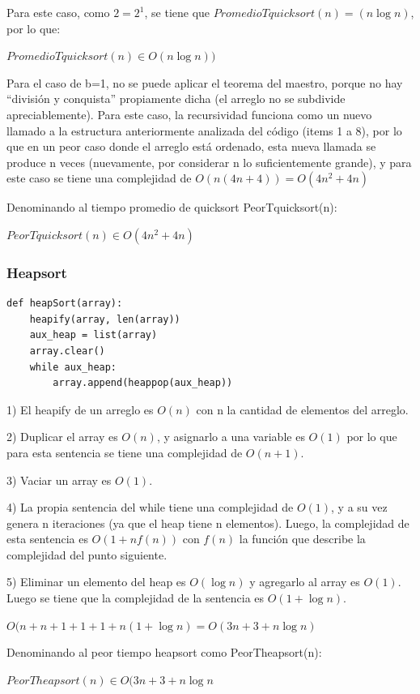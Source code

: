 \documentclass[article,a4paper]{article}
\begin{document}
Para este caso, como $2 = 2^1$, se tiene que $PromedioTquicksort(n) = (n \log n)$, por lo que:

$PromedioTquicksort(n) \in O(n \log n))$

Para el caso de b=1, no se puede aplicar el teorema del maestro, porque no hay “división y conquista” propiamente dicha (el arreglo no se subdivide apreciablemente). Para este caso, la recursividad funciona como un nuevo llamado a la estructura anteriormente analizada del código (items 1 a 8), por lo que en un peor caso donde el arreglo está ordenado, esta nueva llamada se produce n veces (nuevamente, por considerar n lo suficientemente grande), y para este caso se tiene una complejidad de $O( n(4n + 4) ) =  O( 4n^2 + 4n)$

Denominando al tiempo promedio de quicksort PeorTquicksort(n):

$PeorTquicksort(n) \in O(4n^2 + 4n)$

\subsubsection{Heapsort}
\begin{verbatim}
def heapSort(array):
    heapify(array, len(array))
    aux_heap = list(array)
    array.clear()
    while aux_heap:
        array.append(heappop(aux_heap))
\end{verbatim}
1)  El heapify de un arreglo es $O(n)$ con n la cantidad de elementos del arreglo.

2) Duplicar el array es $O(n)$, y asignarlo a una variable es $O(1)$ por lo que para esta sentencia se tiene una complejidad de $O(n + 1)$.

3) Vaciar un array es $O(1)$. 

4) La propia sentencia del while tiene una complejidad de $O(1)$, y a su vez genera n iteraciones (ya que el heap tiene n elementos). Luego, la complejidad de esta sentencia es $O( 1 + nf(n))$ con $f(n)$ la función que describe la complejidad del punto siguiente.

5) Eliminar un elemento del heap es $O(\log n)$ y agregarlo al array es $O(1)$. Luego se tiene que la complejidad de la sentencia es $O(1 + \log n)$. 

$O( n + n +1 + 1 +1+n(1 + \log n  ) = O( 3n + 3 +n \log n )$ 

Denominando al peor tiempo heapsort como PeorTheapsort(n):

$PeorTheapsort(n)  \in O(3n + 3 +n \log n$
\end{document}
